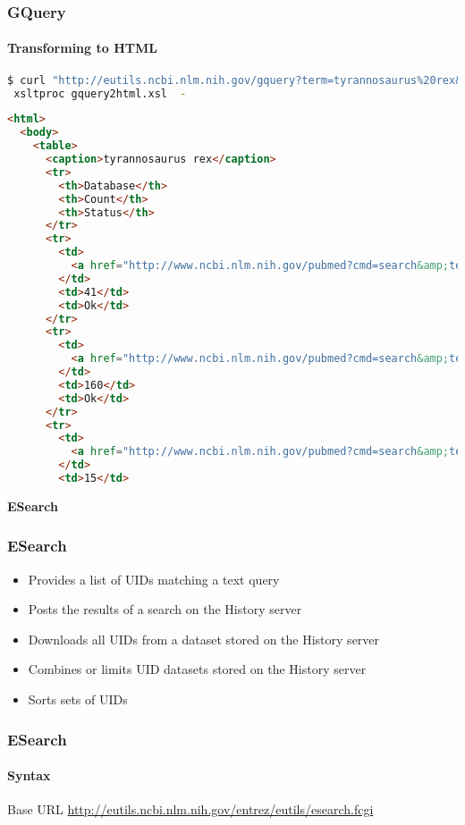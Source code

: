 \documentclass{beamer}
\newcommand{\centeredtitle}[1]{
\begin{center}
    \Huge{\bf{#1}}
\end{center}
}
\newcommand{\hugeslide}[1]{
\begin{frame}
\centeredtitle{#1}
\end{frame}
}
\begin{document}
\begin{frame}[fragile]
\frametitle{GQuery}
\framesubtitle{Transforming to HTML}
\begin{lstlisting}[language=bash,basicstyle=\tiny,breaklines=true]
 $ curl "http://eutils.ncbi.nlm.nih.gov/gquery?term=tyrannosaurus%20rex&retmode=xml" |\
 xsltproc gquery2html.xsl  -
\end{lstlisting}

\begin{lstlisting}[language=html,basicstyle=\tiny,breaklines=false]
<html>
  <body>
    <table>
      <caption>tyrannosaurus rex</caption>
      <tr>
        <th>Database</th>
        <th>Count</th>
        <th>Status</th>
      </tr>
      <tr>
        <td>
          <a href="http://www.ncbi.nlm.nih.gov/pubmed?cmd=search&amp;term=tyrannosaurus+rex">pubmed</a>
        </td>
        <td>41</td>
        <td>Ok</td>
      </tr>
      <tr>
        <td>
          <a href="http://www.ncbi.nlm.nih.gov/pubmed?cmd=search&amp;term=tyrannosaurus+rex">pmc</a>
        </td>
        <td>160</td>
        <td>Ok</td>
      </tr>
      <tr>
        <td>
          <a href="http://www.ncbi.nlm.nih.gov/pubmed?cmd=search&amp;term=tyrannosaurus+rex">mesh</a>
        </td>
        <td>15</td>
\end{lstlisting}
\end{frame}



\hugeslide{ESearch}

\begin{frame}[fragile]
\frametitle{ESearch}
\begin{itemize}
\item Provides a list of UIDs matching a text query
\item Posts the results of a search on the History server
\item Downloads all UIDs from a dataset stored on the History server
\item Combines or limits UID datasets stored on the History server
\item Sorts sets of UIDs
\end{itemize}
\end{frame}


\begin{frame}[fragile]
\frametitle{ESearch}
\framesubtitle{Syntax}
Base URL
\url{http://eutils.ncbi.nlm.nih.gov/entrez/eutils/esearch.fcgi}
\end{frame}
\end{document}
